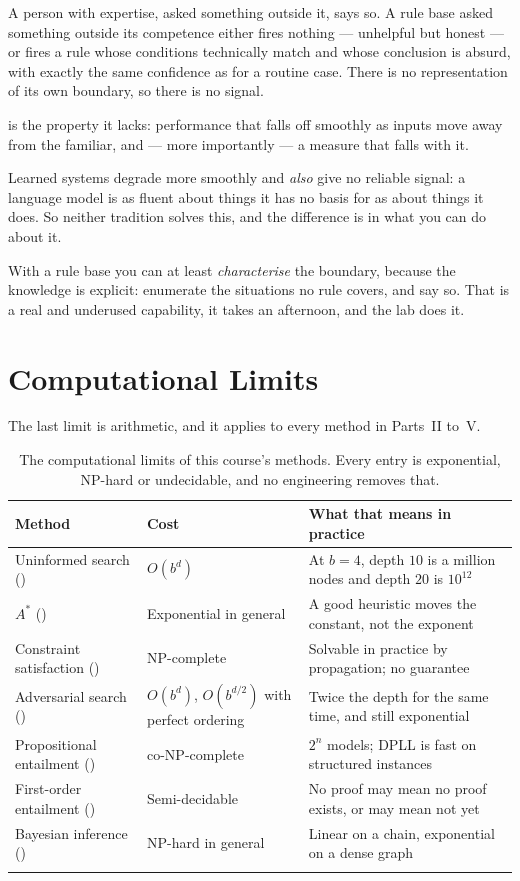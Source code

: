 A person with expertise, asked something outside it, says so. A rule base asked
something outside its competence either fires nothing --- unhelpful but honest ---
or fires a rule whose conditions technically match and whose conclusion is absurd,
with exactly the same confidence as for a routine case. There is no representation
of its own boundary, so there is no signal.

 is the property it lacks: performance that falls off
smoothly as inputs move away from the familiar, and --- more importantly --- a
measure that falls with it.

\begin{conceptbox}
Learned systems degrade more smoothly and \emph{also} give no reliable signal: a
language model is as fluent about things it has no basis for as about things it
does. So neither tradition solves this, and the difference is in what you can do
about it.

With a rule base you can at least \emph{characterise} the boundary, because the
knowledge is explicit: enumerate the situations no rule covers, and say so. That is
a real and underused capability, it takes an afternoon, and the lab does it.
\end{conceptbox}

\section{Computational Limits}

The last limit is arithmetic, and it applies to every method in Parts~II to~V.

\smallskip
\noindent\begin{longtable}{@{}L{4.2cm}L{4.6cm}L{5.7cm}@{}}
\toprule
{}
\textbf{Method} & \textbf{Cost} & \textbf{What that means in practice} \\
\midrule
\endhead
Uninformed search () & $O(b^{d})$ & At $b=4$, depth $10$ is a
million nodes and depth $20$ is $10^{12}$ \\
$A^{*}$ () & Exponential in general & A good heuristic moves the
constant, not the exponent \\
Constraint satisfaction () & NP-complete & Solvable in practice by
propagation; no guarantee \\
Adversarial search () & $O(b^{d})$, $O(b^{d/2})$ with perfect
ordering & Twice the depth for the same time, and still exponential \\
Propositional entailment () & co-NP-complete & $2^{n}$ models;
DPLL is fast on structured instances \\
First-order entailment () & Semi-decidable & No proof may mean no proof
exists, or may mean not yet \\
Bayesian inference () & NP-hard in general & Linear on a chain,
exponential on a dense graph \\
\bottomrule
\caption{The computational limits of this course's methods. Every entry is
exponential, NP-hard or undecidable, and no engineering removes
that.}\label{tab:limits}
\end{longtable}

